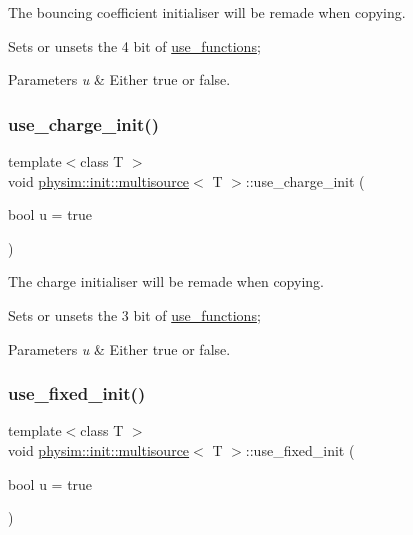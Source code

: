 The bouncing coefficient initialiser will be remade when copying. 

Sets or unsets the 4 bit of \hyperlink{classphysim_1_1init_1_1multisource_a12caae3f36b17cd343065aab62b62a8c}{use\+\_\+functions}; 
\begin{DoxyParams}{Parameters}
{\em u} & Either true or false. \\
\hline
\end{DoxyParams}
\mbox{\label{classphysim_1_1init_1_1multisource_a4bc9fa90be0a91942071746743701edd}} 
\subsubsection{\texorpdfstring{use\+\_\+charge\+\_\+init()}{use\_charge\_init()}}
{\footnotesize\ttfamily template$<$class T $>$ \\
void \hyperlink{classphysim_1_1init_1_1multisource}{physim\+::init\+::multisource}$<$ T $>$\+::use\+\_\+charge\+\_\+init (\begin{DoxyParamCaption}\item[{bool}]{u = {\ttfamily true} }\end{DoxyParamCaption})}



The charge initialiser will be remade when copying. 

Sets or unsets the 3 bit of \hyperlink{classphysim_1_1init_1_1multisource_a12caae3f36b17cd343065aab62b62a8c}{use\+\_\+functions}; 
\begin{DoxyParams}{Parameters}
{\em u} & Either true or false. \\
\hline
\end{DoxyParams}
\mbox{\label{classphysim_1_1init_1_1multisource_a58ee9fcd33be010bc6e4df0da14b39ae}} 
\subsubsection{\texorpdfstring{use\+\_\+fixed\+\_\+init()}{use\_fixed\_init()}}
{\footnotesize\ttfamily template$<$class T $>$ \\
void \hyperlink{classphysim_1_1init_1_1multisource}{physim\+::init\+::multisource}$<$ T $>$\+::use\+\_\+fixed\+\_\+init (\begin{DoxyParamCaption}\item[{bool}]{u = {\ttfamily true} }\end{DoxyParamCaption})}



